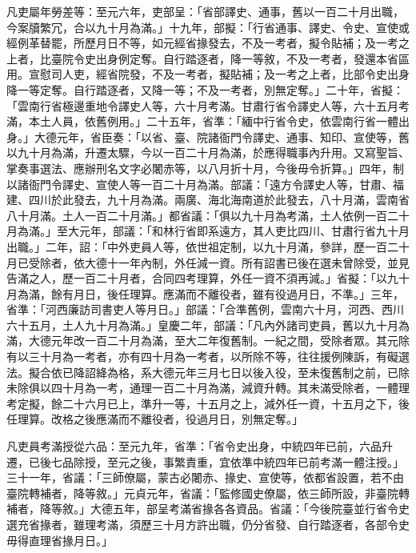 \begin{pinyinscope}
 凡吏屬年勞差等：至元六年，吏部呈：「省部譯史、通事，舊以一百二十月出職，今案牘繁冗，合以九十月為滿。」十九年，部擬：「行省通事、譯史、令史、宣使或經例革替罷，所歷月日不等，如元經省掾發去，不及一考者，擬令貼補；及一考之上者，比臺院令史出身例定奪。自行踏逐者，降一等敘，不及一考者，發還本省區用。宣慰司人吏，經省院發，不及一考者，擬貼補；及一考之上者，比部令史出身降一等定奪。自行踏逐者，又降一等；不及一考者，別無定奪。」二十年，省擬：「雲南行省極邊重地令譯史人等，六十月考滿。甘肅行省令譯史人等，六十五月考滿，本土人員，依舊例用。」二十五年，省準：「緬中行省令史，依雲南行省一體出身。」大德元年，省臣奏：「以省、臺、院諸衙門令譯史、通事、知印、宣使等，舊以九十月為滿，升遷太驟，今以一百二十月為滿，於應得職事內升用。又寫聖旨、掌奏事選法、應辦刑名文字必闍赤等，以八月折十月，今後毋令折算。」四年，制以諸衙門令譯史、宣使人等一百二十月為滿。部議：「遠方令譯史人等，甘肅、福建、四川於此發去，九十月為滿。兩廣、海北海南道於此發去，八十月滿，雲南省八十月滿。土人一百二十月滿。」都省議：「俱以九十月為考滿，土人依例一百二十月為滿。」至大元年，部議：「和林行省即系遠方，其人吏比四川、甘肅行省九十月出職。」二年，詔：「中外吏員人等，依世祖定制，以九十月滿，參詳，歷一百二十月已受除者，依大德十一年內制，外任減一資。所有詔書已後在選未曾除受，並見告滿之人，歷一百二十月者，合同四考理算，外任一資不須再減。」省擬：「以九十月為滿，餘有月日，後任理算。應滿而不離役者，雖有役過月日，不準。」三年，省準：「河西廉訪司書吏人等月日。」部議：「合準舊例，雲南六十月，河西、西川六十五月，土人九十月為滿。」皇慶二年，部議：「凡內外諸司吏員，舊以九十月為滿，大德元年改一百二十月為滿，至大二年復舊制。一紀之間，受除者眾。其元除有以三十月為一考者，亦有四十月為一考者，以所除不等，往往援例陳訴，有礙選法。擬合依已降詔絳為格，系大德元年三月七日以後入役，至未復舊制之前，已除未除俱以四十月為一考，通理一百二十月為滿，減資升轉。其未滿受除者，一體理考定擬，餘二十六月已上，準升一等，十五月之上，減外任一資，十五月之下，後任理算。改格之後應滿而不離役者，役過月日，別無定奪。」



 凡吏員考滿授從六品：至元九年，省準：「省令史出身，中統四年已前，六品升遷，已後七品除授，至元之後，事繁責重，宜依準中統四年已前考滿一體注授。」三十一年，省議：「三師僚屬，蒙古必闍赤、掾史、宣使等，依都省設置，若不由臺院轉補者，降等敘。」元貞元年，省議：「監修國史僚屬，依三師所設，非臺院轉補者，降等敘。」大德五年，部呈考滿省掾各各資品。省議：「今後院臺並行省令史選充省掾者，雖理考滿，須歷三十月方許出職，仍分省發、自行踏逐者，各部令史毋得直理省掾月日。」




\end{pinyinscope}

